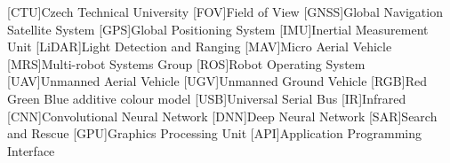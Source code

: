 
\begin{acronym}
  [CTU]{Czech Technical University}
  [FOV]{Field of View}
  [GNSS]{Global Navigation Satellite System}
  [GPS]{Global Positioning System}
  [IMU]{Inertial Measurement Unit}
  [LiDAR]{Light Detection and Ranging}
  [MAV]{Micro Aerial Vehicle}
  [MRS]{Multi-robot Systems Group}
  [ROS]{Robot Operating System}
  [UAV]{Unmanned Aerial Vehicle}
  [UGV]{Unmanned Ground Vehicle}
  [RGB]{Red Green Blue additive colour model}
  [USB]{Universal Serial Bus}
  [IR]{Infrared}
  [CNN]{Convolutional Neural Network}
  [DNN]{Deep Neural Network}
  [SAR]{Search and Rescue}
  [GPU]{Graphics Processing Unit}
  [API]{Application Programming Interface}
\end{acronym}
